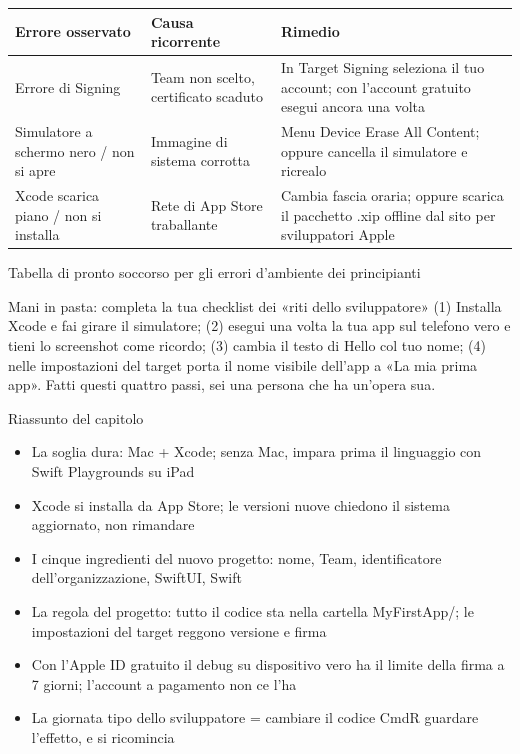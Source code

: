 \begin{center}
\begin{tabularx}{\linewidth}{|X|X|X|}
\hline
\textbf{Errore osservato} & \textbf{Causa ricorrente} & \textbf{Rimedio} \tabularnewline
\hline
Errore di Signing & Team non scelto, certificato scaduto & In Target Signing seleziona il tuo account; con l'account gratuito esegui ancora una volta \tabularnewline
Simulatore a schermo nero / non si apre & Immagine di sistema corrotta & Menu Device Erase All Content; oppure cancella il simulatore e ricrealo \tabularnewline
Xcode scarica piano / non si installa & Rete di App Store traballante & Cambia fascia oraria; oppure scarica il pacchetto .xip offline dal sito per sviluppatori Apple \tabularnewline
\hline
\end{tabularx}
\end{center}

\begin{center}\small\color{gray}Tabella di pronto soccorso per gli errori d'ambiente dei principianti\end{center}

\begin{tcbpractice}{Mani in pasta: completa la tua checklist dei «riti dello sviluppatore»}
(1) Installa Xcode e fai girare il simulatore; (2) esegui una volta la tua app sul telefono vero e tieni lo screenshot come ricordo; (3) cambia il testo di Hello col tuo nome; (4) nelle impostazioni del target porta il nome visibile dell'app a «La mia prima app». Fatti questi quattro passi, sei una persona che ha un'opera sua.

\end{tcbpractice}

\begin{tcbsummary}{Riassunto del capitolo}
\begin{itemize}
  \item La soglia dura: Mac + Xcode; senza Mac, impara prima il linguaggio con Swift Playgrounds su iPad
  \item Xcode si installa da App Store; le versioni nuove chiedono il sistema aggiornato, non rimandare
  \item I cinque ingredienti del nuovo progetto: nome, Team, identificatore dell'organizzazione, SwiftUI, Swift
  \item La regola del progetto: tutto il codice sta nella cartella MyFirstApp/; le impostazioni del target reggono versione e firma
  \item Con l'Apple ID gratuito il debug su dispositivo vero ha il limite della firma a 7 giorni; l'account a pagamento non ce l'ha
  \item La giornata tipo dello sviluppatore = cambiare il codice CmdR guardare l'effetto, e si ricomincia
\end{itemize}

\end{tcbsummary}
